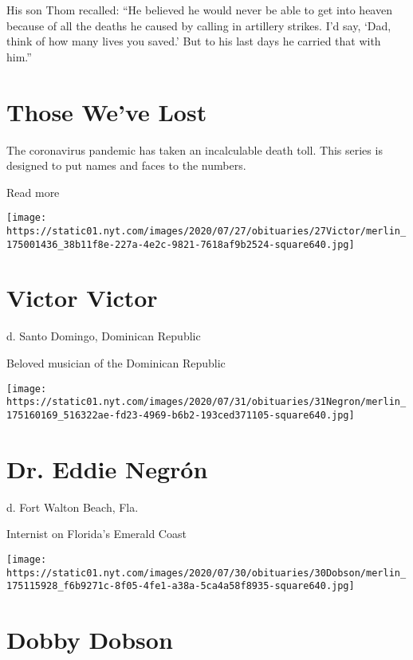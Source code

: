 His son Thom recalled: ``He believed he would never be able to get into
heaven because of all the deaths he caused by calling in artillery
strikes. I'd say, `Dad, think of how many lives you saved.' But to his
last days he carried that with him.''

\href{https://www.nytimes.com/interactive/2020/obituaries/people-died-coronavirus-obituaries.html?action=click\&pgtype=Article\&state=default\&region=BELOW_MAIN_CONTENT\&context=covid_obits_promo}{}

\hypertarget{those-weve-lost}{%
\section{Those We've Lost}\label{those-weve-lost}}

The coronavirus pandemic has taken an incalculable death toll. This
series is designed to put names and faces to the numbers.

Read more

\texttt{[image: https://static01.nyt.com/images/2020/07/27/obituaries/27Victor/merlin\_175001436\_38b11f8e-227a-4e2c-9821-7618af9b2524-square640.jpg]}

\hypertarget{victor-victor}{%
\section{Victor Victor}\label{victor-victor}}

d. Santo Domingo, Dominican Republic

Beloved musician of the Dominican Republic

\texttt{[image: https://static01.nyt.com/images/2020/07/31/obituaries/31Negron/merlin\_175160169\_516322ae-fd23-4969-b6b2-193ced371105-square640.jpg]}

\hypertarget{dr-eddie-negruxf3n}{%
\section{Dr. Eddie Negrón}\label{dr-eddie-negruxf3n}}

d. Fort Walton Beach, Fla.

Internist on Florida's Emerald Coast

\texttt{[image: https://static01.nyt.com/images/2020/07/30/obituaries/30Dobson/merlin\_175115928\_f6b9271c-8f05-4fe1-a38a-5ca4a58f8935-square640.jpg]}

\hypertarget{dobby-dobson}{%
\section{Dobby Dobson}\label{dobby-dobson}}


